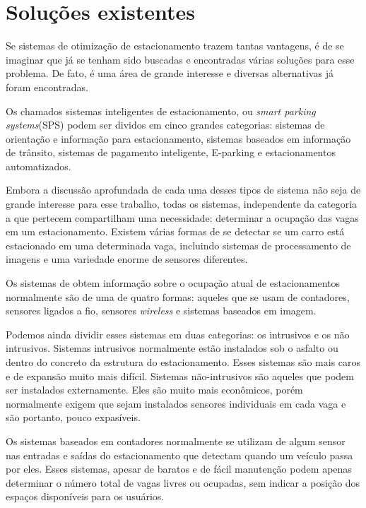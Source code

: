 \section{Soluções existentes} \label{solucoes}
    Se sistemas de otimização de estacionamento trazem tantas vantagens, é de se imaginar que já se tenham sido buscadas e encontradas várias soluções para esse problema. De fato, é uma área de grande interesse e diversas alternativas já foram encontradas.

    Os chamados sistemas inteligentes de estacionamento, ou \textit{smart parking systems}(SPS) podem ser dividos em cinco grandes categorias\cite{idris09}: sistemas de orientação e informação para estacionamento, sistemas baseados em informação de trânsito, sistemas de pagamento inteligente, E-parking e estacionamentos automatizados.

    Embora a discussão aprofundada de cada uma desses tipos de sistema não seja de grande interesse para esse trabalho, todas os sistemas, independente da categoria a que pertecem compartilham uma necessidade: determinar a ocupação das vagas em um estacionamento. Existem várias formas de se detectar se um carro está estacionado em uma determinada vaga, incluindo sistemas de processamento de imagens e uma variedade enorme de sensores diferentes.

    Os sistemas de obtem informação sobre o ocupação atual de estacionamentos normalmente são de uma de quatro formas\cite{bong2008integrated}: aqueles que se usam de contadores, sensores ligados a fio, sensores \textit{wireless} e sistemas baseados em imagem.

    Podemos ainda dividir esses sistemas em duas categorias: os intrusivos e os não intrusivos\cite{idris09}. Sistemas intrusivos normalmente estão instalados sob o asfalto ou dentro do concreto da estrutura do estacionamento. Esses sistemas são mais caros e de expansão muito mais difícil. Sistemas não-intrusivos são aqueles que podem ser instalados externamente. Eles são muito mais econômicos, porém normalmente exigem que sejam instalados sensores individuais em cada vaga e são portanto, pouco expasíveis.

    Os sistemas baseados em contadores normalmente se utilizam de algum sensor nas entradas e saídas do estacionamento que detectam quando um veículo passa por eles. Esses sistemas, apesar de baratos e de fácil manutenção podem apenas determinar o número total de vagas livres ou ocupadas, sem indicar a posição dos espaços disponíveis para os usuários.

